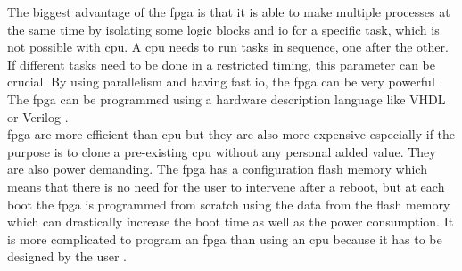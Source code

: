The biggest advantage of the \gls{fpga} is that it is able to make multiple processes at the same time by isolating some logic blocks and \gls{io} for a specific task, which is not possible with \gls{cpu}. A \gls{cpu} needs to run tasks in sequence, one after the other. If different tasks need to be done in a restricted timing, this parameter can be crucial. 
By using parallelism and having fast \gls{io}, the \gls{fpga} can be very powerful \citep {FPGA_youtube} \citep{FPGA_center} \citep{FPGA_toronto}. \\

The \gls{fpga} can be programmed using a hardware description language like VHDL or Verilog \citep {FPGA_youtube} \citep{FPGA_center} \citep{FPGA_toronto}. \\

\gls{fpga} are more efficient than \gls{cpu} but they are also more expensive especially if the purpose is to clone a pre-existing \gls{cpu} without any personal added value. They are also power demanding. The \gls{fpga} has a configuration flash memory which means that there is no need for the user to intervene after a reboot, but at each boot the \gls{fpga} is programmed from scratch using the data from the flash memory which can drastically increase the boot time as well as the power consumption. It is more complicated to program an \gls{fpga} than using an \gls{cpu} because it has to be designed by the user \citep {FPGA_youtube} \citep{FPGA_center} \citep{FPGA_toronto}. \\








